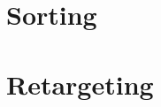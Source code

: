 \section{Sorting}
\label{ch:Content2:sec:Sorting}




\section{Retargeting}
\label{ch:Content2:sec:Retargeting}




